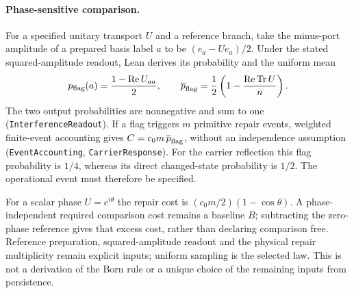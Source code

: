 \paragraph{Phase-sensitive comparison.}
For a specified unitary transport $U$ and a reference branch, take the minus-port
amplitude of a prepared basis label $a$ to be $(e_a-Ue_a)/2$. Under the stated
squared-amplitude readout, Lean derives its probability and the uniform mean
\begin{equation}
 p_{\rm flag}(a)=\frac{1-\operatorname{Re}U_{aa}}2,\qquad
 \overline p_{\rm flag}=\frac12\left(1-\frac{\operatorname{Re}\operatorname{Tr}U}{n}\right).
\end{equation}
The two output probabilities are nonnegative and sum to one
(\nolinkurl{InterferenceReadout}). If a flag triggers $m$ primitive repair events,
weighted finite-event accounting gives $C=c_0m\,\overline p_{\rm flag}$, without an
independence assumption (\nolinkurl{EventAccounting}, \nolinkurl{CarrierResponse}).
For the carrier reflection this flag probability is $1/4$, whereas its direct
changed-state probability is $1/2$. The operational event must therefore be specified.

For a scalar phase $U=e^{i\theta}$ the repair cost is $(c_0m/2)(1-\cos\theta)$.
A phase-independent required comparison cost remains a baseline $B$; subtracting
the zero-phase reference gives that excess cost, rather than declaring comparison
free. Reference preparation, squared-amplitude readout and the
physical repair multiplicity remain explicit inputs; uniform sampling is the selected law. This is not a derivation of
the Born rule or a unique choice of the remaining inputs from persistence.
